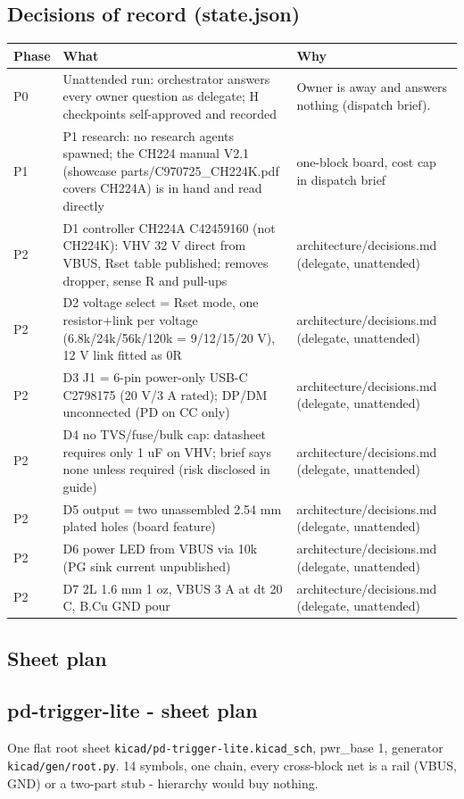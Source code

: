 \documentclass[11pt,a4paper]{article}
\begin{document}
\subsection*{Decisions of record (state.json)}
{\small
\begin{longtable}{lp{5.2cm}p{7.2cm}}
\toprule
\textbf{Phase} & \textbf{What} & \textbf{Why} \\
\midrule
\endhead
P0 & Unattended run: orchestrator answers every owner question as delegate; H checkpoints self-approved and recorded & Owner is away and answers nothing (dispatch brief). \\
P1 & P1 research: no research agents spawned; the CH224 manual V2.1 (showcase parts/C970725\_CH224K.pdf covers CH224A) is in hand and read directly & one-block board, cost cap in dispatch brief \\
P2 & D1 controller CH224A C42459160 (not CH224K): VHV 32 V direct from VBUS, Rset table published; removes dropper, sense R and pull-ups & architecture/decisions.md (delegate, unattended) \\
P2 & D2 voltage select = Rset mode, one resistor+link per voltage (6.8k/24k/56k/120k = 9/12/15/20 V), 12 V link fitted as 0R & architecture/decisions.md (delegate, unattended) \\
P2 & D3 J1 = 6-pin power-only USB-C C2798175 (20 V/3 A rated); DP/DM unconnected (PD on CC only) & architecture/decisions.md (delegate, unattended) \\
P2 & D4 no TVS/fuse/bulk cap: datasheet requires only 1 uF on VHV; brief says none unless required (risk disclosed in guide) & architecture/decisions.md (delegate, unattended) \\
P2 & D5 output = two unassembled 2.54 mm plated holes (board feature) & architecture/decisions.md (delegate, unattended) \\
P2 & D6 power LED from VBUS via 10k (PG sink current unpublished) & architecture/decisions.md (delegate, unattended) \\
P2 & D7 2L 1.6 mm 1 oz, VBUS 3 A at dt 20 C, B.Cu GND pour & architecture/decisions.md (delegate, unattended) \\
\bottomrule
\end{longtable}
}
\subsection*{Sheet plan}
\subsection*{pd-trigger-lite - sheet plan}
One flat root sheet \texttt{kicad/pd-trigger-lite.kicad\_sch}, pwr\_base 1, generator \texttt{kicad/gen/root.py}. 14 symbols, one chain, every cross-block net is a rail (VBUS, GND) or a two-part stub - hierarchy would buy nothing.
\end{document}

